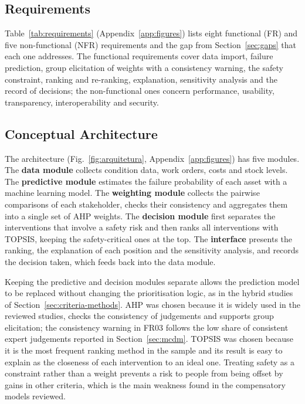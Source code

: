 \subsection{Requirements}
\label{sec:requirements}

Table~\ref{tab:requirements} (Appendix~\ref{app:figures}) lists eight functional (FR) and five non-functional (NFR) requirements and the gap from Section~\ref{sec:gaps} that each one addresses. The functional requirements cover data import, failure prediction, group elicitation of weights with a consistency warning, the safety constraint, ranking and re-ranking, explanation, sensitivity analysis and the record of decisions; the non-functional ones concern performance, usability, transparency, interoperability and security.

\subsection{Conceptual Architecture}
\label{sec:architecture}

The architecture (Fig.~\ref{fig:arquitetura}, Appendix~\ref{app:figures}) has five modules. The \textbf{data module} collects condition data, work orders, costs and stock levels. The \textbf{predictive module} estimates the failure probability of each asset with a machine learning model. The \textbf{weighting module} collects the pairwise comparisons of each stakeholder, checks their consistency and aggregates them into a single set of AHP weights. The \textbf{decision module} first separates the interventions that involve a safety risk and then ranks all interventions with TOPSIS, keeping the safety-critical ones at the top. The \textbf{interface} presents the ranking, the explanation of each position and the sensitivity analysis, and records the decision taken, which feeds back into the data module.

Keeping the predictive and decision modules separate allows the prediction model to be replaced without changing the prioritisation logic, as in the hybrid studies of Section~\ref{sec:criteria-methods}. AHP was chosen because it is widely used in the reviewed studies, checks the consistency of judgements and supports group elicitation; the consistency warning in FR03 follows the low share of consistent expert judgements reported in Section~\ref{sec:mcdm}. TOPSIS was chosen because it is the most frequent ranking method in the sample and its result is easy to explain as the closeness of each intervention to an ideal one. Treating safety as a constraint rather than a weight prevents a risk to people from being offset by gains in other criteria, which is the main weakness found in the compensatory models reviewed.


